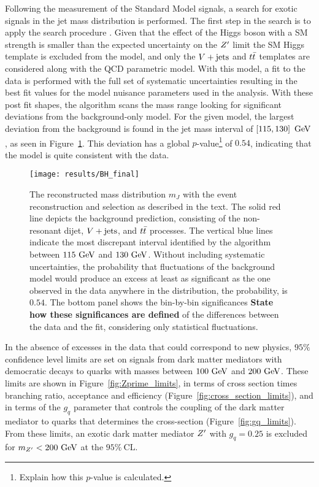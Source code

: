 Following the measurement of the Standard Model signals, a search for exotic signals in the \largeR jet mass distribution is performed.
The first step in the search is to apply the \BumpHunter{} search procedure \cite{Aaltonen:2008vt,Choudalakis:2011qn}.
Given that the effect of the Higgs boson with a SM strength is smaller than the expected uncertainty on the $Z'$ limit the SM Higgs template is excluded from the model, and only the $V + \text{jets}$ and $t\bar{t}$ templates are considered along with the QCD parametric model.
With this model, a fit to the data is performed with the full set of systematic uncertainties resulting in the best fit values for the model nuisance parameters used in the analysis.
With these post fit shapes, the \BumpHunter{} algorithm scans the mass range looking for significant deviations from the background-only model.
For the given model, the largest deviation from the background is found in the \largeR jet mass interval of $\left[115,130\right]~\mathrm{GeV}$, as seen in Figure~\ref{fig:BumpHunter_scan}.
This deviation has a \BumpHunter{} global $p$-value\footnote{\TODO{} Explain how this \BumpHunter{} $p$-value is calculated.} of $0.54$, indicating that the model is quite consistent with the data.\\

\begin{figure}[htbp]
 \centering
 \texttt{[image: results/BH\_final]}
 \caption{The reconstructed mass distribution $m_{J}$ with the event reconstruction and selection as described in the text.
  The solid red line depicts the background prediction, consisting of the non-resonant dijet, $V + \text{jets}$, and $t\bar{t}$ processes.
  The vertical blue lines indicate the most discrepant interval identified by the \BumpHunter{} algorithm between $115~\mathrm{GeV}$ and $130~\mathrm{GeV}$.
  Without including systematic uncertainties, the probability that fluctuations of the background model would produce an excess at least as significant as the one observed in the data anywhere in the distribution, the \BumpHunter{} probability, is $0.54$.
  The bottom panel shows the bin-by-bin significances \textbf{\TODO{} State how these significances are defined} of the differences between the data and the fit, considering only statistical fluctuations.
 }
 \label{fig:BumpHunter_scan}
\end{figure}

In the absence of excesses in the data that could correspond to new physics, $95\%$ confidence level limits are set on signals from dark matter mediators with democratic decays to quarks with masses between $100~\mathrm{GeV}$ and $200~\mathrm{GeV}$.
These limits are shown in Figure~\ref{fig:Zprime_limits}, in terms of cross section times branching ratio, acceptance and efficiency (Figure~\ref{fig:cross_section_limits}), and in terms of the $g_{q}$ parameter that controls the coupling of the \gls{dark matter mediator} to quarks that determines the cross-section (Figure~\ref{fig:gq_limits}).
From these limits, an exotic dark matter mediator $Z'$ with $g_{q}=0.25$ is excluded for $m_{Z'} < 200~\mathrm{GeV}$ at the $95\%~\mathrm{CL}$.

